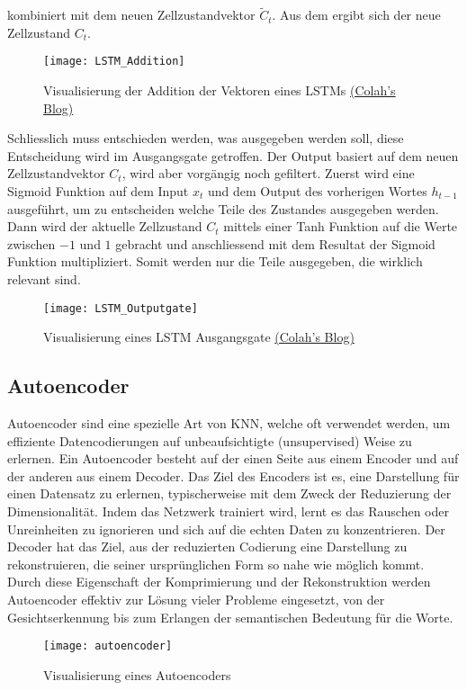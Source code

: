 kombiniert mit dem neuen Zellzustandvektor $\tilde{C}_t$. Aus dem ergibt sich der neue Zellzustand $C_t$.
\newline
\begin{figure}[H]
	\centering
	\texttt{[image: LSTM\_Addition]}
	\caption{Visualisierung der Addition der Vektoren eines LSTMs \href{http://colah.github.io/posts/2015-08-Understanding-LSTMs}{(Colah's Blog)}}
	\label{fig:LSTM-Addition}
\end{figure}
\noindent
Schliesslich muss entschieden werden, was ausgegeben werden soll, diese Entscheidung wird im Ausgangsgate getroffen. Der
Output basiert auf dem neuen Zellzustandvektor $C_t$, wird aber vorgängig noch gefiltert. Zuerst wird eine Sigmoid
Funktion auf dem Input $x_t$ und dem Output des vorherigen Wortes $h_{t-1}$ ausgeführt, um zu entscheiden welche Teile
des Zustandes ausgegeben werden. Dann wird der aktuelle Zellzustand $C_t$ mittels einer Tanh Funktion auf die Werte
zwischen $-1$ und $1$ gebracht und anschliessend mit dem Resultat der Sigmoid Funktion multipliziert. Somit werden nur
die Teile ausgegeben, die wirklich relevant sind.
\newline
\begin{figure}[H]
	\centering
	\texttt{[image: LSTM\_Outputgate]}
	\caption{Visualisierung eines LSTM Ausgangsgate \href{http://colah.github.io/posts/2015-08-Understanding-LSTMs}{(Colah's Blog)}}
	\label{fig:LSTM-Outputgate}
\end{figure}

\subsection{Autoencoder}
\label{sub:autoencoder}
Autoencoder sind eine spezielle Art von \gls{KNN}, welche oft verwendet werden, um effiziente
Datencodierungen auf unbeaufsichtigte (unsupervised) Weise zu erlernen. Ein Autoencoder besteht auf der einen Seite aus
einem Encoder und auf der anderen aus einem Decoder. 
\newline
\newline
Das Ziel des Encoders ist es, eine Darstellung für einen Datensatz zu erlernen, typischerweise mit dem Zweck der
Reduzierung der Dimensionalität. Indem das Netzwerk trainiert wird, lernt es das Rauschen oder Unreinheiten zu
ignorieren und sich auf die echten Daten zu konzentrieren.
\newline
\newline
Der Decoder hat das Ziel, aus der reduzierten Codierung eine Darstellung zu rekonstruieren, die seiner ursprünglichen
Form so nahe wie möglich kommt.
\newline
\newline
Durch diese Eigenschaft der Komprimierung und der Rekonstruktion werden Autoencoder effektiv zur Lösung vieler Probleme
eingesetzt, von der Gesichtserkennung bis zum Erlangen der semantischen Bedeutung für die Worte.
\begin{figure}[H]
	\centering
	\texttt{[image: autoencoder]}
	\caption{Visualisierung eines Autoencoders}
	\label{fig:Autoencoder}
\end{figure}

